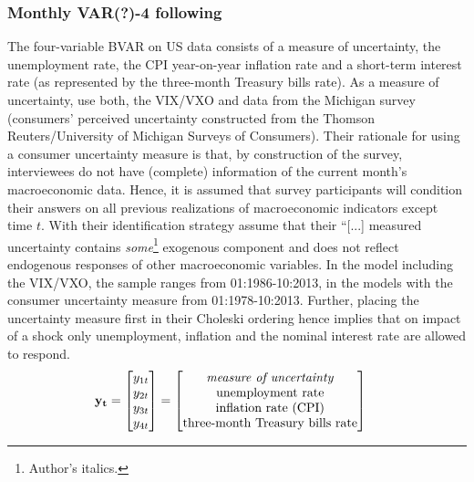 \documentclass[a4paper,11pt,listof=nochaptergap,oneside,pointednumbers,bibtotoc,bigheadings,liststotoc,hidelinks]{scrbook}
\theoremstyle{mysatz}
\theoremstyle{mydefinition}
\theoremstyle{mytheorem}
\theoremstyle{mybemerkung}
\newcommand{\vect}[1]{\boldsymbol{\mathbf{#1}}}
\begin{document}
\subsubsection{Monthly VAR(?)-4 following \citet{leducandliu:16}}
The four-variable BVAR on US data consists of a measure of uncertainty, the unemployment rate, the CPI year-on-year inflation rate and a short-term interest rate (as represented by the three-month Treasury bills rate). As a measure of uncertainty, \citet{leducandliu:16} use both, the VIX/VXO and data from the Michigan survey (consumers' perceived uncertainty constructed from the Thomson Reuters/University of Michigan Surveys of Consumers). Their rationale for using a consumer uncertainty measure is that, by construction of the survey, interviewees do not have (complete) information of the current month's macroeconomic data. Hence, it is assumed that survey participants will condition their answers on all previous realizations of macroeconomic indicators except time $t$. With their identification strategy \citet[p. 23]{leducandliu:16} assume that their ``[...] measured uncertainty contains \textit{some}\footnote{Author's italics.} exogenous component and does not reflect endogenous responses of other macroeconomic variables. In the model including the VIX/VXO, the sample ranges from 01:1986-10:2013, in the models with the consumer uncertainty measure from 01:1978-10:2013. Further, placing the uncertainty measure first in their Choleski ordering hence implies that on impact of a shock only unemployment, inflation and the nominal interest rate are allowed to respond.
\begin{equation} \label{eq:VAR22}
\begin{split}
\vect{y_t} & = 
 \begin{bmatrix} 
 		y_{1t} \\
		y_{2t} \\
		y_{3t} \\
		y_{4t}
	      \end{bmatrix} = 	      
	      \begin{bmatrix} \text{\textit{measure of uncertainty}} \\ 
				      \text{unemployment rate}\\ 
				      \text{inflation rate (CPI)}\\
				      \text{three-month Treasury bills rate}
	      \end{bmatrix}
\end{split}
\end{equation}
\end{document}
